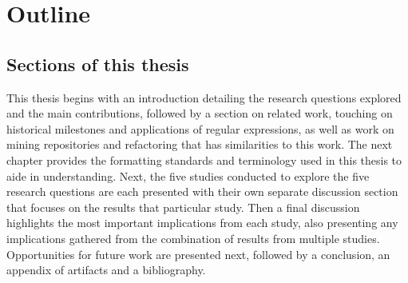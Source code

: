 \section{Outline}

\subsection{Sections of this thesis}
This thesis begins with an introduction detailing the research questions explored and the main contributions, followed by a section on related work, touching on historical milestones and applications of regular expressions, as well as work on mining repositories and refactoring that has similarities to this work. The next chapter provides the formatting standards and terminology used in this thesis to aide in understanding.  Next, the five studies conducted to explore the five research questions are each presented with their own separate discussion section that focuses on the results that particular study.  Then a final discussion highlights the most important implications from each study, also presenting any implications gathered from the combination of results from multiple studies. Opportunities for future work are presented next, followed by a conclusion, an appendix of artifacts and a bibliography.
